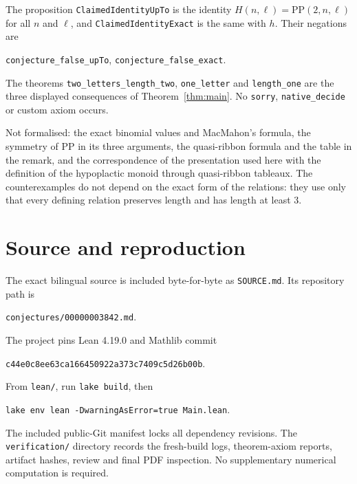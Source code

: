 \documentclass[11pt]{article}
\theoremstyle{remark}
\begin{document}
The proposition \texttt{ClaimedIdentityUpTo} is the identity
$H(n,\ell)=\mathrm{PP}(2,n,\ell)$ for all $n$ and $\ell$, and
\texttt{ClaimedIdentityExact} is the same with $h$. Their negations are
\begin{center}\small
\texttt{conjecture\_false\_upTo},\quad
\texttt{conjecture\_false\_exact}.
\end{center}
The theorems \texttt{two\_letters\_length\_two}, \texttt{one\_letter}
and \texttt{length\_one} are the three displayed consequences of
Theorem~\ref{thm:main}. No \texttt{sorry}, \texttt{native\_decide} or
custom axiom occurs.

Not formalised: the exact binomial values and MacMahon's formula, the
symmetry of $\mathrm{PP}$ in its three arguments, the quasi-ribbon
formula and the table in the remark, and the correspondence of the
presentation used here with the definition of the hypoplactic monoid
through quasi-ribbon tableaux. The counterexamples do not depend on the
exact form of the relations: they use only that every defining relation
preserves length and has length at least $3$.

\section*{Source and reproduction}
The exact bilingual source is included byte-for-byte as
\texttt{SOURCE.md}. Its repository path is
\begin{center}\small\texttt{conjectures/00000003842.md}.\end{center}
The project pins Lean 4.19.0 and Mathlib commit
\begin{center}\small\texttt{c44e0c8ee63ca166450922a373c7409c5d26b00b}.\end{center}
From \texttt{lean/}, run \texttt{lake build}, then
\begin{center}\small\texttt{lake env lean -DwarningAsError=true Main.lean}.\end{center}
The included public-Git manifest locks all dependency revisions. The
\texttt{verification/} directory records the fresh-build logs,
theorem-axiom reports, artifact hashes, review and final PDF
inspection. No supplementary numerical computation is required.
\end{document}
